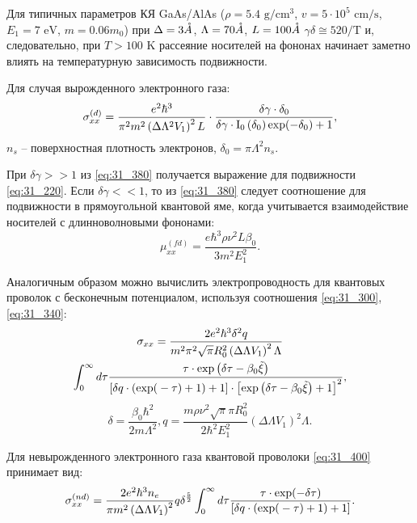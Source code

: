 Для типичных параметров КЯ GaAs/AlAs ($\rho =5.4 \text{ g} / \text{cm}^3 $, $v=5\cdot 10^{5} \text{ cm/s}$, $E_{1} =7 \text{  eV}$, $m=0.06m_{0} $) при $\Delta =3 \AA$, $\Lambda =70 \AA$, $L = 100 \AA$  $\gamma \delta \cong 520/\text{T}$ и, следовательно, при $T>100\text{ K}$ рассеяние носителей на фононах начинает заметно влиять на температурную зависимость подвижности.

Для случая вырожденного электронного газа:
\begin{equation} \label{eq:31_380}
\sigma _{xx}^{(d)} =\frac{e^{2} \hbar ^{3} }{\pi ^{2} m^{2} \left(\Delta \Lambda ^{2} V_{1} \right)^{2} L} \cdot \frac{\delta \gamma \cdot \delta _{0} }{\delta \gamma \cdot {\rm I}_{{\rm 0}} \left(\delta _{0} \right){\rm exp}(-\delta _{0} )+1} ,
\end{equation}
$n_{s} $ -- поверхностная плотность электронов, $\delta _{0} =\pi \Lambda ^{2} n_{s} $.

При $\delta \gamma >>1$ из \eqref{eq:31_380} получается выражение для подвижности \eqref{eq:31_220}. Если $\delta \gamma <<1$, то из \eqref{eq:31_380} следует соотношение для подвижности в прямоугольной квантовой яме, когда учитывается взаимодействие носителей с длинноволновыми фононами:
\begin{equation} \label{eq:31_390}
\mu _{xx}^{(fd)} =\frac{e\hbar ^{3} \rho \nu ^{2} L\beta _{0} }{3m^{2} E_{1}^{2} }. 
\end{equation}
 
Аналогичным образом можно вычислить электропроводность для квантовых проволок с бесконечным потенциалом, используя соотношения \eqref{eq:31_300}, \eqref{eq:31_340}:
\begin{multline} \label{eq:31_400}
\sigma _{xx} =\frac{2e^{2} \hbar ^{3} \delta ^{2} q}{m^{2} \pi ^{2} \sqrt{\pi } R_{0}^{2} \left(\Delta \Lambda V_{1} \right)^{2} \Lambda } \\
\int _{0}^{\infty }d\tau \frac{\tau \cdot {\exp}\left(\delta \tau -\beta _{0} \tilde{\xi }\right)}{\left[\delta q\cdot \left({\rm exp(}-\tau )+1\right)+1\right]\cdot \left[{\exp}\left(\delta \tau -\beta _{0} \tilde{\xi }\right)+1\right]^{2} }, 
\end{multline}
\[\delta =\frac{\beta _{0} \hbar ^{2} }{2m\Lambda ^{2} } , q=\frac{m\rho \nu ^{2} \sqrt{\pi } \pi R_{0}^{2} }{2\hbar ^{2} E_{1}^{2} } \left(\Delta \Lambda V_{1} \right)^{2} \Lambda .\] 

Для невырожденного электронного газа квантовой проволоки \eqref{eq:31_400} принимает вид:
\begin{equation} \label{eq:31_410}
\sigma _{xx}^{(nd)} =\frac{2e^{2} \hbar ^{3} n_{e} }{\pi m^{2} \left(\Delta \Lambda V_{1} \right)^{2} } q\delta ^{\frac{5}{2} } \int _{0}^{\infty }d\tau \frac{\tau \cdot \exp (-\delta \tau )}{\left[\delta q\cdot \left({\rm exp(}-\tau )+1\right)+1\right]}. 
 \end{equation}

